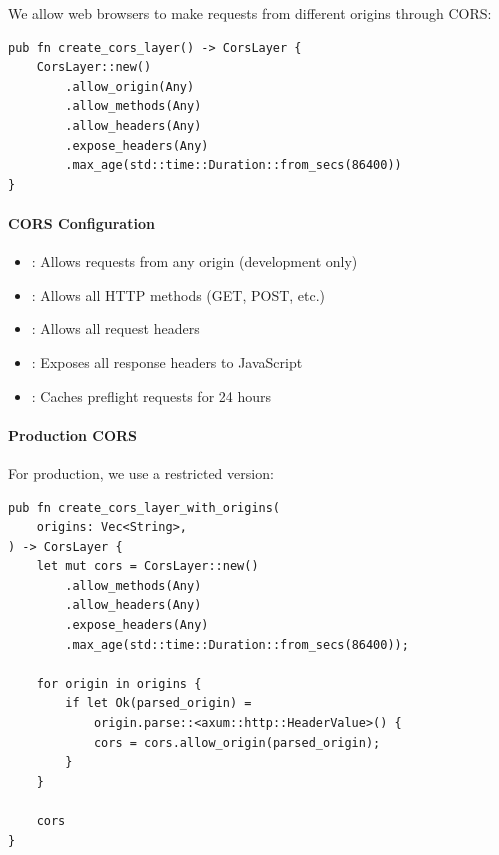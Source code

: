 We allow web browsers to make requests from different origins through CORS:

\begin{listing}[htbp]
\caption{CORS middleware configuration}
\label{lst:middleware-cors}
\begin{verbatim}
pub fn create_cors_layer() -> CorsLayer {
    CorsLayer::new()
        .allow_origin(Any)
        .allow_methods(Any)
        .allow_headers(Any)
        .expose_headers(Any)
        .max_age(std::time::Duration::from_secs(86400))
}
\end{verbatim}
\end{listing}

\paragraph{CORS Configuration}

\begin{itemize}
  \item {}: Allows requests from any origin (development only)
  \item {}: Allows all HTTP methods (GET, POST, etc.)
  \item {}: Allows all request headers
  \item {}: Exposes all response headers to JavaScript
  \item {}: Caches preflight requests for 24 hours
\end{itemize}

\paragraph{Production CORS}

For production, we use a restricted version:

\begin{listing}[htbp]
\caption{Production CORS with restricted origins}
\label{lst:middleware-cors-prod}
\begin{verbatim}
pub fn create_cors_layer_with_origins(
    origins: Vec<String>,
) -> CorsLayer {
    let mut cors = CorsLayer::new()
        .allow_methods(Any)
        .allow_headers(Any)
        .expose_headers(Any)
        .max_age(std::time::Duration::from_secs(86400));

    for origin in origins {
        if let Ok(parsed_origin) =
            origin.parse::<axum::http::HeaderValue>() {
            cors = cors.allow_origin(parsed_origin);
        }
    }

    cors
}
\end{verbatim}
\end{listing}

